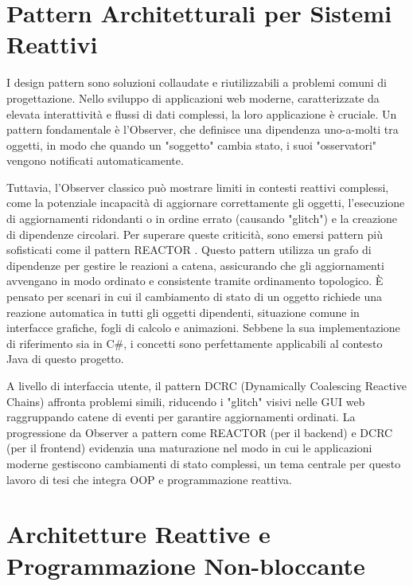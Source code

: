 \documentclass[12pt,a4paper,openright,twoside]{book}
\begin{document}
\section{Pattern Architetturali per Sistemi Reattivi}
\label{sec:pattern_reattivi}

I design pattern sono soluzioni collaudate e riutilizzabili a problemi comuni di progettazione.  Nello sviluppo di applicazioni web moderne, caratterizzate da elevata interattività e flussi di dati complessi, la loro applicazione è cruciale.  Un pattern fondamentale è l'Observer, che definisce una dipendenza uno-a-molti tra oggetti, in modo che quando un "soggetto" cambia stato, i suoi "osservatori" vengono notificati automaticamente. 

Tuttavia, l'Observer classico può mostrare limiti in contesti reattivi complessi, come la potenziale incapacità di aggiornare correttamente gli oggetti, l'esecuzione di aggiornamenti ridondanti o in ordine errato (causando "glitch") e la creazione di dipendenze circolari.  Per superare queste criticità, sono emersi pattern più sofisticati come il pattern REACTOR \cite{Mijac2021Reactor}.  Questo pattern utilizza un grafo di dipendenze per gestire le reazioni a catena, assicurando che gli aggiornamenti avvengano in modo ordinato e consistente tramite ordinamento topologico.  È pensato per scenari in cui il cambiamento di stato di un oggetto richiede una reazione automatica in tutti gli oggetti dipendenti, situazione comune in interfacce grafiche, fogli di calcolo e animazioni.  Sebbene la sua implementazione di riferimento sia in C\#, i concetti sono perfettamente applicabili al contesto Java di questo progetto. 

A livello di interfaccia utente, il pattern DCRC (Dynamically Coalescing Reactive Chains) \cite{Oliveira2024DCRC} affronta problemi simili, riducendo i "glitch" visivi nelle GUI web raggruppando catene di eventi per garantire aggiornamenti ordinati.  La progressione da Observer a pattern come REACTOR (per il backend) e DCRC (per il frontend) evidenzia una maturazione nel modo in cui le applicazioni moderne gestiscono cambiamenti di stato complessi, un tema centrale per questo lavoro di tesi che integra OOP e programmazione reattiva. 

\section{Architetture Reattive e Programmazione Non-bloccante}
\label{sec:architetture_reattive}
\end{document}
